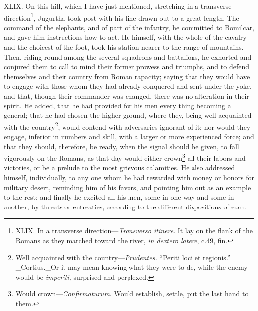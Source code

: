 XLIX. On this hill, which I have just mentioned, stretching in a
transverse direction\footnote{XLIX. In a transverse direction—\emph{Transverso itinere}. It lay on
the flank of the Romans as they marched toward the river, \emph{in dextero
latere}, c.49, fin.}, Jugurtha took post with his line drawn out
to a great length. The command of the elephants, and of part of the
infantry, he committed to Bomilcar, and gave him instructions how to
act. He himself, with the whole of the cavalry and the choicest of the
foot, took his station nearer to the range of mountains. Then, riding
round among the several squadrons and battalions, he exhorted and
conjured them to call to mind their former prowess and triumphs, and
to defend themselves and their country from Roman rapacity; saying
that they would have to engage with those whom they had already
conquered and sent under the yoke, and that, though their commander
was changed, there was no alteration in their spirit. He added, that
he had provided for his men every thing becoming a general; that he
had chosen the higher ground, where they, being well acquainted with
the country\footnote{Well acquainted with the country—\emph{Prudentes.} ``Periti loci
et regionis.'' \_Cortius.\_Or it may mean knowing what they were to do,
while the enemy would be \emph{imperiti,} surprised and perplexed.}, would contend with adversaries ignorant of it; nor
would they engage, inferior in numbers and skill, with a larger or
more experienced force; and that they should, therefore, be ready,
when the signal should be given, to fall vigorously on the Romans, as
that day would either crown\footnote{Would crown—\emph{Confirmaturum}. Would establish, settle, put the
last hand to them.} all their labors and victories, or be
a prelude to the most grievous calamities. He also addressed himself,
individually, to any one whom he had rewarded with money or honors for
military desert, reminding him of his favors, and pointing him out as
an example to the rest; and finally he excited all his men, some in
one way and some in another, by threats or entreaties, according to
the different dispositions of each.

